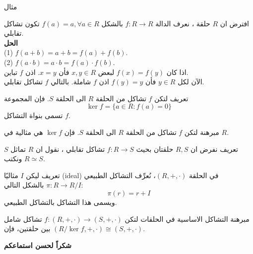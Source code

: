		\begin{frame}
			\begin{exampleblock}{مثال}
				
				افترض ان $R$ حلقة ، نعرف الدالة $f : R\to R$ بالشكل 
				$f(a) = a, \forall a\in R$
				تكون تشاكل تقابلي.\\
				\noindent
				\textbf{الحل}\\
				\noindent
				(1) $f(a + b) = a + b = f(a) + f(b)$.\\
				(2) $f(a\cdot b) = a\cdot b = f(a) \cdot f(b)$. \\
				اذا كان 
				$f(x) = f(y)$ لبعض $x,y \in R$ فأن $x=y$. اذن $f$ تباين.\\
				الآن لكل $y\in R$ فأن $ f(y) = y$ اذن $f$ شاملة. بالتالي $f$ تشاكل تقابلي.
			\end{exampleblock}
			
			\pause
			\begin{exampleblock}{تعريف}
					لتكن $f$ تشاكل من الحلقة $R$ الى الحلقة $S$. فإن المجموعة 
				\[
				\ker f = \{a\in R : f(a) = 0\}
				\]
				تسمى بنواة التشاكل $f$.
			\end{exampleblock}
		\end{frame}

\begin{frame}
	\begin{exampleblock}{مبرهنة}
				لتكن $f$ تشاكل من الحلقة $R$ الى الحلقة $S$. فإن $\ker f$ هي مثالية في $R$.
	\end{exampleblock}
	
	\pause
	\begin{exampleblock}{تعريف}
		نفرض ان $R, S$ حلقتان بحيث $f:R\to S$ تشاكل تقابلي ، نقول ان $R$ تماثل $S$ ونكتب $R\simeq S$.
	\end{exampleblock}
	
	\pause
	\begin{exampleblock}{تعريف}
		ليكن $I$ مثاليًا (ideal) في الحلقة $(R, +, \cdot)$، نُعرِّف التشاكل الطبيعي 
		$\pi : R \to R/I$ بالشكل التالي:
		\[
		\pi(r) = r + I
		\]
		ويسمى هذا التشاكل {بالتشاكل الطبيعي}.
	\end{exampleblock}
	
	\pause
	\begin{exampleblock}{مبرهنة التشاكل الاساسية في الحلقات} 
		لتكن 
		$f : (R, +, \cdot) \to (S, +, \cdot)$ تشاكل شامل بين حلقتين، فإن 
		$(R/\ker f, +, \cdot) \cong (S, +, \cdot)$.
	\end{exampleblock}
\end{frame}

\begin{frame}
	\Huge
	\begin{center}
		\textbf{شكراً لحسن استماعكم}
	\end{center}
\end{frame}
	
